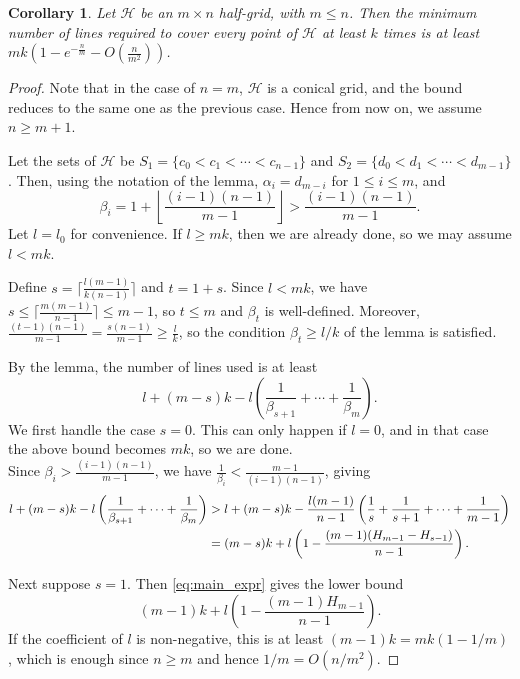\documentclass[usenames,dvipsnames, 11pt]{article}
\newtheorem{cor}[thm]{Corollary}
\numberwithin{thm}{section}
\theoremstyle{definition}
\theoremstyle{definition}
\theoremstyle{definition}
\newcommand{\1}{\mathbf{1}}
\def\cH{{\mathcal H}}
\begin{document}
\begin{cor}
    Let $\cH$ be an $m \times n$ half-grid, with $m \leq n$. Then the minimum number of lines required to cover every point of $\cH$ at least $k$ times is at least $mk\left(1-e^{-\frac{n}{m}}-O(\frac{n}{m^2})\right)$.
\end{cor}
\begin{proof}
    Note that in the case of $n=m$, $\cH$ is a conical grid, and the bound reduces to the same one as the previous case. Hence from now on, we assume $n \geq m+1$. 
    
    Let the sets of $\cH$ be $S_1=\{c_0<c_1<\cdots<c_{n-1}\}$ and $S_2=\{d_0<d_1<\cdots<d_{m-1}\}$. Then, using the notation of the lemma, $\alpha_i=d_{m-i}$ for $1 \leq i \leq m$, and 
    $$\beta_i=1+\left\lfloor\frac{(i-1)(n-1)}{m-1}\right\rfloor > \frac{(i-1)(n-1)}{m-1}.$$ 
    Let $l=l_0$ for convenience. If $l \geq mk$, then we are already done, so we may assume $l < mk$.
 
    Define $s = \lceil \frac{l(m-1)}{k(n-1)} \rceil$ and $t = 1+s$. 
    Since $l < mk$, we have $s \leq \lceil \frac{m(m-1)}{n-1} \rceil \leq m-1$, so $t \leq m$ and $\beta_t$ is well-defined.
    Moreover, $\frac{(t-1)(n-1)}{m-1} = \frac{s(n-1)}{m-1} \geq \frac{l}{k}$, so the condition $\beta_t \geq l/k$ of the lemma is satisfied.
 
    By the lemma, the number of lines used is at least
    $$l+(m-s)k - l\left(\frac{1}{\beta_{s+1}}+\cdots + \frac{1}{\beta_m}\right).$$
    We first handle the case $s=0$. This can only happen if $l=0$, and in that case the above bound becomes $mk$, so we are done. \\
    
    Since $\beta_i > \frac{(i-1)(n-1)}{m-1}$, we have $\frac{1}{\beta_i} < \frac{m-1}{(i-1)(n-1)}$, giving
    \begin{align}
    l+(m-s)k-l\left(\frac{1}{\beta_{s+1}}+\cdots + \frac{1}{\beta_m}\right) & > l+(m-s)k-\frac{l(m-1)}{n-1} \left( \frac{1}{s}+\frac{1}{s+1}+\cdots+\frac{1}{m-1}\right) \notag\\
    &= (m-s)k+l\left(1-\frac{(m-1)(H_{m-1}-H_{s-1})}{n-1}\right). \label{eq:main_expr}
    \end{align}

    Next suppose $s=1$. Then \eqref{eq:main_expr} gives the lower bound
    \[
    (m-1)k+
    l\left(1-\frac{(m-1)H_{m-1}}{n-1}\right).
    \]
    If the coefficient of $l$ is non-negative, this is at least
    $(m-1)k=mk(1-1/m)$, which is enough since $n\geq m$ and hence
    $1/m=O(n/m^2)$.


\end{proof}
\end{document}
